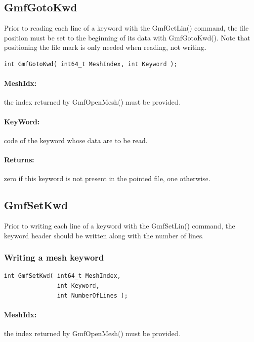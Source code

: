 \documentclass[a4paper,12pt]{article}
\begin{document}
\subsection{GmfGotoKwd}
Prior to reading each line of a keyword with the GmfGetLin() command, the file position must be set to the beginning of its data with GmfGotoKwd(). Note that positioning the file mark is only needed when reading, not writing.

\begin{tt}
\begin{verbatim}
int GmfGotoKwd( int64_t MeshIndex, int Keyword );
\end{verbatim}
\end{tt}
\normalfont

\paragraph{MeshIdx:}
the index returned by GmfOpenMesh() must be provided.

\paragraph{KeyWord:} code of the keyword whose data are to be read.

\paragraph{Returns:} zero if this keyword is not present in the pointed file, one otherwise.


\subsection{GmfSetKwd}
Prior to writing each line of a keyword with the GmfSetLin() command, the keyword header should be written along with the number of lines.

\subsubsection{Writing a mesh keyword}

\begin{tt}
\begin{verbatim}
int GmfSetKwd( int64_t MeshIndex,
               int Keyword,
               int NumberOfLines );
\end{verbatim}
\end{tt}
\normalfont

\paragraph{MeshIdx:}
the index returned by GmfOpenMesh() must be provided.
\end{document}
